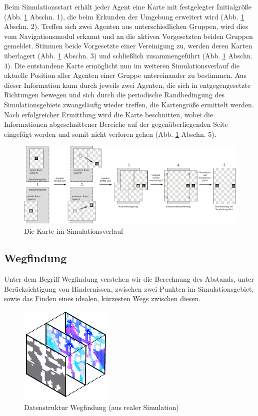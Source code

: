 \documentclass[runningheads]{llncs}
\begin{document}
Beim Simulationsstart erhält jeder Agent eine Karte mit festgelegter Initialgröße (Abb. \ref{Karte} Abschn. 1), die beim Erkunden der Umgebung erweitert wird (Abb. \ref{Karte} Abschn. 2). Treffen sich zwei Agenten aus unterschiedlichen Gruppen, wird dies vom Navigationsmodul erkannt und an die aktiven Vorgesetzten beiden Gruppen gemeldet. Stimmen beide Vorgesetzte einer Vereinigung zu, werden deren Karten überlagert (Abb. \ref{Karte} Abschn. 3) und schließlich zusammengeführt (Abb. \ref{Karte} Abschn. 4). Die entstandene Karte ermöglicht nun im weiteren Simulationsverlauf die aktuelle Position aller Agenten einer Gruppe untereinander zu bestimmen. Aus dieser Information kann durch jeweils zwei Agenten, die sich in entgegengesetzte Richtungen bewegen und sich durch die periodische Randbedingung \cite{Bungartz2013} des Simulationsgebiets zwangsläufig wieder treffen, die Kartengröße ermittelt werden. Nach erfolgreicher Ermittlung wird die Karte beschnitten, wobei die Informationen abgeschnittener Bereiche auf der gegenüberliegenden Seite eingefügt werden und somit nicht verloren gehen (Abb. \ref{Karte} Abschn. 5).
\vspace{-3mm}
\begin{figure}[h]
\includegraphics[scale=0.8]{./Referenzen/Kartenmerge.pdf}
\caption{Die Karte im Simulationsverlauf}
\label{Karte}
\end{figure}

\vspace{-8mm}
\subsection{Wegfindung}\label{wegfindung}
Unter dem Begriff Wegfindung verstehen wir die Berechnung des Abstands, unter Berücksichtigung von Hindernissen, zwischen zwei Punkten im Simulationsgebiet, sowie das Finden eines idealen, kürzesten Wegs zwischen diesen.

\begin{figure}
\vspace{-5mm}
\includegraphics{./Referenzen/Pathfinding.pdf}
\caption{Datenstruktur Wegfindung (aus realer Simulation)}
\label{pathfinding}
\end{figure}
\end{document}
